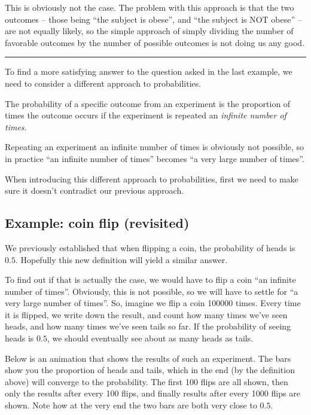 \documentclass[]{book}
\theoremstyle{definition}
\theoremstyle{definition}
\theoremstyle{definition}
\theoremstyle{remark}
\let\BeginKnitrBlock\begin \let\EndKnitrBlock\end
\begin{document}
This is obviously not the case. The problem with this approach is that the two outcomes -- those being ``the subject is obese'', and ``the subject is NOT obese'' -- are not equally likely, so the simple approach of simply dividing the number of favorable outcomes by the number of possible outcomes is not doing us any good.

\begin{center}\rule{0.5\linewidth}{\linethickness}\end{center}

To find a more satisfying answer to the question asked in the last example, we need to consider a different approach to probabilities.

\BeginKnitrBlock{definition}
\protect\hypertarget{def:prob-def-2}{}{\label{def:prob-def-2} }The probability of a specific outcome from an experiment is the proportion of times the outcome occurs if the experiment is repeated an \emph{infinite number of times}.
\EndKnitrBlock{definition}

Repeating an experiment an infinite number of times is obviously not possible, so in practice ``an infinite number of times'' becomes ``a very large number of times''.

When introducing this different approach to probabilities, first we need to make sure it doesn't contradict our previous approach.

\hypertarget{example-coin-flip-revisited}{%
\subsection{Example: coin flip (revisited)}\label{example-coin-flip-revisited}}

We previously established that when flipping a coin, the probability of heads is \(0.5\). Hopefully this new definition will yield a similar answer.

To find out if that is actually the case, we would have to flip a coin ``an infinite number of times''. Obviously, this is not possible, so we will have to settle for ``a very large number of times''. So, imagine we flip a coin 100000 times. Every time it is flipped, we write down the result, and count how many times we've seen heads, and how many times we've seen tails so far. If the probability of seeing heads is \(0.5\), we should eventually see about as many heads as tails.

Below is an animation that shows the results of such an experiment. The bars show you the proportion of heads and tails, which in the end (by the definition above) will converge to the probability. The first 100 flips are all shown, then only the results after every 100 flips, and finally results after every 1000 flips are shown. Note how at the very end the two bars are both very close to \(0.5\).
\end{document}
